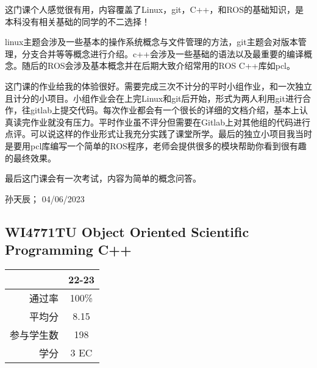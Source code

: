 这门课个人感觉很有用，内容覆盖了Linux，git，C++，和ROS的基础知识，是本科没有相关基础的同学的不二选择！

linux主题会涉及一些基本的操作系统概念与文件管理的方法，git主题会对版本管理，分支合并等等概念进行介绍。c++会涉及一些基础的语法以及最重要的编译概念。随后的ROS会涉及基本概念并在后期大致介绍常用的ROS C++库如pcl。

这门课的作业给我的体验很好。需要完成三次不计分的平时小组作业，和一次独立且计分的小项目。小组作业会在上完Linux和git后开始，形式为两人利用git进行合作，往gitlab上提交代码。每次作业都会有一个很长的详细的文档介绍，基本上认真读完作业就没有压力。平时作业虽不评分但需要在Gitlab上对其他组的代码进行点评。可以说这样的作业形式让我充分实践了课堂所学。最后的独立小项目我当时是要用pcl库编写一个简单的ROS程序，老师会提供很多的模块帮助你看到很有趣的最终效果。

最后这门课会有一次考试，内容为简单的概念问答。
\begin{flushright}
孙天辰； 04/06/2023
\end{flushright}


\subsection{WI4771TU Object Oriented Scientific Programming C++}
\begin{minipage}{0.45\textwidth}
\centering
{}
\end{minipage}%
\begin{minipage}{0.45\textwidth}
\raggedleft
\begin{tabular}{r|c}
\textbf{ } & \textbf{22-23} \\ \hline
通过率 & 100\% \\ 
平均分 & 8.15 \\ 
参与学生数 & 198 \\
学分 & 3 EC\\
\end{tabular}
\end{minipage}\\

